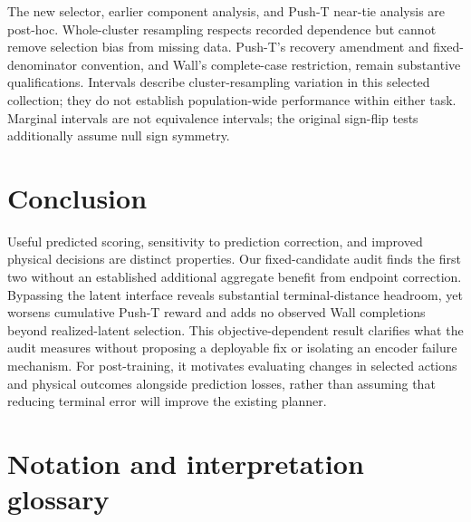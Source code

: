 \documentclass{article}
\begin{document}
The new selector, earlier component analysis, and Push-T near-tie analysis
are post-hoc. Whole-cluster resampling respects recorded dependence but cannot
remove selection bias from missing data. Push-T's recovery amendment and
fixed-denominator convention, and Wall's complete-case restriction, remain
substantive qualifications. Intervals describe cluster-resampling variation
in this selected collection; they do not establish population-wide performance
within either task. Marginal intervals are not equivalence intervals;
the original sign-flip tests additionally assume null sign symmetry.

\section{Conclusion}

Useful predicted scoring, sensitivity to prediction correction, and improved
physical decisions are distinct properties. Our fixed-candidate audit finds
the first two without an established additional aggregate benefit from
endpoint correction. Bypassing the latent interface reveals substantial
terminal-distance headroom, yet worsens cumulative Push-T reward and adds no
observed Wall completions beyond realized-latent selection. This objective-dependent result clarifies what the
audit measures without proposing a deployable fix or isolating an encoder
failure mechanism. For post-training, it motivates evaluating changes in
selected actions and physical outcomes alongside prediction losses, rather
than assuming that reducing terminal error will improve the existing planner.

\clearpage



\clearpage
\appendix
\section{Notation and interpretation glossary}
\label{app:glossary}
\end{document}
